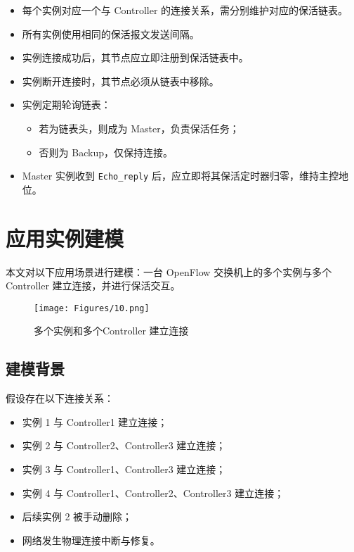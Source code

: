 \documentclass{article}
\begin{document}
\begin{itemize}
    \item 每个实例对应一个与 Controller 的连接关系，需分别维护对应的保活链表。
    \item 所有实例使用相同的保活报文发送间隔。
    \item 实例连接成功后，其节点应立即注册到保活链表中。
    \item 实例断开连接时，其节点必须从链表中移除。
    \item 实例定期轮询链表：
    \begin{itemize}
        \item 若为链表头，则成为 Master，负责保活任务；
        \item 否则为 Backup，仅保持连接。
    \end{itemize}
    \item Master 实例收到 \texttt{Echo\_reply} 后，应立即将其保活定时器归零，维持主控地位。
\end{itemize}



     
\section{应用实例建模}

\quad\quad 本文对以下应用场景进行建模：一台 OpenFlow 交换机上的多个实例与多个 Controller 建立连接，并进行保活交互。


\begin{figure}[h]
    \centering
    \texttt{[image: Figures/10.png]}
    \caption{多个实例和多个Controller 建立连接}
\end{figure}


\subsection{\textbf{建模背景}}

假设存在以下连接关系：

\begin{itemize}
    \item 实例 1 与 Controller1 建立连接；
    \item 实例 2 与 Controller2、Controller3 建立连接；
    \item 实例 3 与 Controller1、Controller3 建立连接；
    \item 实例 4 与 Controller1、Controller2、Controller3 建立连接；
    \item 后续实例 2 被手动删除；
    \item 网络发生物理连接中断与修复。
\end{itemize}
\end{document}
